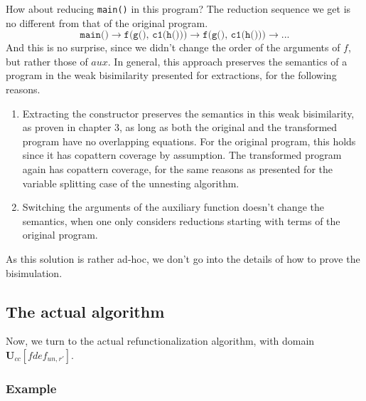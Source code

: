 How about reducing \texttt{main()} in this program? The reduction sequence we get is no different from that of the original program.
\[
\texttt{main()} \longrightarrow \texttt{f(g(), c1(h()))} \longrightarrow \texttt{f(g(), c1(h()))} \longrightarrow ...
\]
And this is no surprise, since we didn't change the order of the arguments of $f$, but rather those of $aux$. In general, this approach preserves the semantics of a program in the weak bisimilarity presented for extractions, for the following reasons.
\begin{enumerate}
\item Extracting the constructor preserves the semantics in this weak bisimilarity, as proven in chapter 3, as long as both the original and the transformed program have no overlapping equations. For the original program, this holds since it has copattern coverage by assumption. The transformed program again has copattern coverage, for the same reasons as presented for the variable splitting case of the unnesting algorithm.

\item Switching the arguments of the auxiliary function doesn't change the semantics, when one only considers reductions starting with terms of the original program.
\end{enumerate}
As this solution is rather ad-hoc, we don't go into the details of how to prove the bisimulation.

\subsection{The actual algorithm}

Now, we turn to the actual refunctionalization algorithm, with domain $\mathbf{U}_{cc}[fdef_{un,r'}]$.

\subsubsection{Example}

